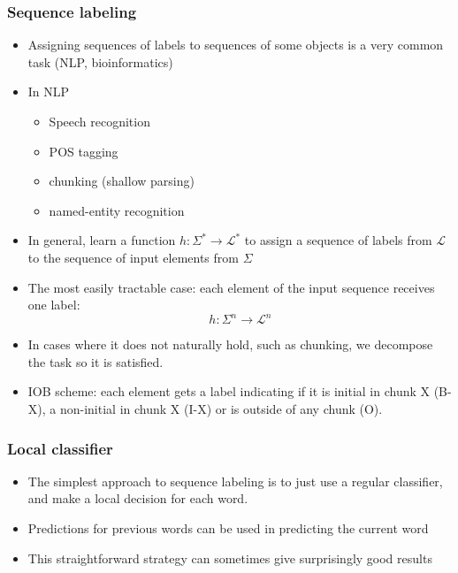 \documentclass[usenames,dvipsnames]{beamer}
\begin{document}
\begin{frame}
 \frametitle{Sequence labeling}
\begin{itemize}
\item Assigning sequences of labels to sequences of some objects is a
  very common task (NLP, bioinformatics)
\item In NLP 

\begin{itemize}
\item Speech recognition 
 \item POS tagging
 \item chunking (shallow parsing)
 \item named-entity recognition
 \end{itemize}
\end{itemize}
\end{frame}


\begin{frame}
\begin{itemize}
\item In general, learn a function $h : \Sigma^* \rightarrow
  \mathcal{L}^*$ to assign a sequence of labels from $\mathcal{L}$ to
  the sequence of input elements from $\Sigma$
\item The most easily tractable case: each element of the input
  sequence receives one label:
\[
 h : \Sigma^n \rightarrow \mathcal{L}^n
\]
\item In cases where it does not naturally hold, such as chunking, we
  decompose the task so it is satisfied.
\item IOB scheme: each element gets a label indicating if it is
  initial in chunk X (B-X), a non-initial in chunk X (I-X) or is
  outside of any chunk (O).
\end{itemize}
\end{frame}

\begin{frame}
 \frametitle{Local classifier}
\begin{itemize}
\item The simplest approach to sequence labeling is to just use a
  regular classifier, and make a local decision for each
  word.
\item Predictions for previous words can be used in predicting the
  current word
\item This straightforward strategy can sometimes give surprisingly
  good results
\end{itemize}
\end{frame}
\end{document}
